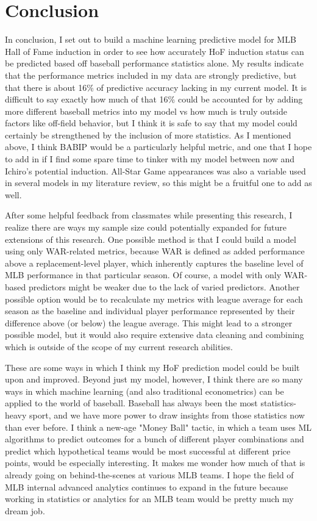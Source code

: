 \documentclass[12pt,english]{article}
\begin{document}
\section{Conclusion}\label{sec:conclusion}
In conclusion, I set out to build a machine learning predictive model for MLB Hall of Fame induction in order to see how accurately HoF induction status can be predicted based off baseball performance statistics alone. My results indicate that the performance metrics included in my data are strongly predictive, but that there is about 16\% of predictive accuracy lacking in my current model. It is difficult to say exactly how much of that 16\% could be accounted for by adding more different baseball metrics into my model vs how much is truly outside factors like off-field behavior, but I think it is safe to say that my model could certainly be strengthened by the inclusion of more statistics. As I mentioned above, I think BABIP would be a particularly helpful metric, and one that I hope to add in if I find some spare time to tinker with my model between now and Ichiro's potential induction. All-Star Game appearances was also a variable used in several models in my literature review, so this might be a fruitful one to add as well. 

After some helpful feedback from classmates while presenting this research, I realize there are ways my sample size could potentially expanded for future extensions of this research. One possible method is that I could build a model using only WAR-related metrics, because WAR is defined as added performance above a replacement-level player, which inherently captures the baseline level of MLB performance in that particular season. Of course, a model with only WAR-based predictors might be weaker due to the lack of varied predictors. Another possible option would be to recalculate my metrics with league average for each season as the baseline and individual player performance represented by their difference above (or below) the league average. This might lead to a stronger possible model, but it would also require extensive data cleaning and combining which is outside of the scope of my current research abilities.  

These are some ways in which I think my HoF prediction model could be built upon and improved. Beyond just my model, however, I think there are so many ways in which machine learning (and also traditional econometrics) can be applied to the world of baseball. Baseball has always been the most statistics-heavy sport, and we have more power to draw insights from those statistics now than ever before. I think a new-age "Money Ball" tactic, in which a team uses ML algorithms to predict outcomes for a bunch of different player combinations and predict which hypothetical teams would be most successful at different price points, would be especially interesting. It makes me wonder how much of that is already going on behind-the-scenes at various MLB teams. I hope the field of MLB internal advanced analytics continues to expand in the future because working in statistics or analytics for an MLB team would be pretty much my dream job. 
\end{document}
